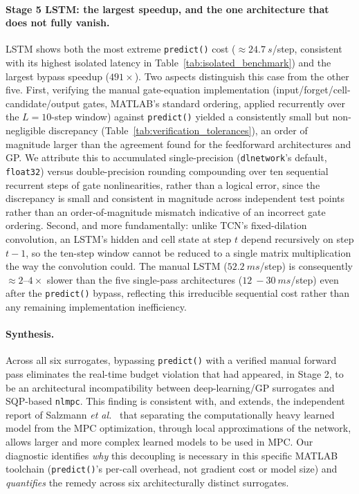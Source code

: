 \paragraph{Stage 5  LSTM: the largest speedup, and the one
architecture that does not fully vanish.} LSTM shows both the most
extreme \texttt{predict()} cost ($\approx\SI{24.7}{s}$/step, consistent
with its highest isolated latency in Table~\ref{tab:isolated_benchmark})
and the largest bypass speedup ($491\times$). Two aspects distinguish
this case from the other five. First, verifying the manual
gate-equation implementation (input/forget/cell-candidate/output gates,
MATLAB's standard ordering, applied recurrently over the
$L=10$-step window) against \texttt{predict()} yielded a consistently
small but non-negligible discrepancy (Table~\ref{tab:verification_tolerances}),
an order of magnitude larger than the agreement found for the feedforward architectures
and GP. We attribute this to accumulated single-precision
(\texttt{dlnetwork}'s default, \texttt{float32}) versus
double-precision rounding compounding over ten sequential recurrent
steps of gate nonlinearities, rather than a logical error, since the
discrepancy is small and consistent in magnitude across independent
test points rather than an order-of-magnitude mismatch indicative of an
incorrect gate ordering.
\label{subsec:lstm_precision_note}
Second, and more fundamentally: unlike TCN's fixed-dilation
convolution, an LSTM's hidden and cell state at step $t$ depend
recursively on step $t-1$, so the ten-step window cannot be reduced to
a single matrix multiplication the way the convolution could. The
manual LSTM ($\SI{52.2}{ms}$/step) is consequently $\approx 2$--$4\times$
slower than the five single-pass architectures ($\SI{12}{-}\SI{30}{ms}$/step)
even after the \texttt{predict()} bypass, reflecting this irreducible
sequential cost rather than any remaining implementation inefficiency.

\paragraph{Synthesis.} Across all six surrogates, bypassing
\texttt{predict()} with a verified manual forward pass eliminates the
real-time budget violation that had appeared, in Stage 2, to be an
architectural incompatibility between deep-learning/GP surrogates and
SQP-based \texttt{nlmpc}. {\color{auditP2}This finding is consistent with, and extends,
the independent report of Salzmann \emph{et al.}~\cite{salzmann_real-time_2022} that separating
the computationally heavy learned model from the MPC optimization,
through local approximations of the network, allows larger and more
complex learned models to be used in MPC. Our diagnostic identifies \emph{why} this
decoupling is necessary in this specific MATLAB toolchain
(\texttt{predict()}'s per-call overhead, not gradient cost or
model size) and \emph{quantifies} the remedy across six architecturally
distinct surrogates.}


